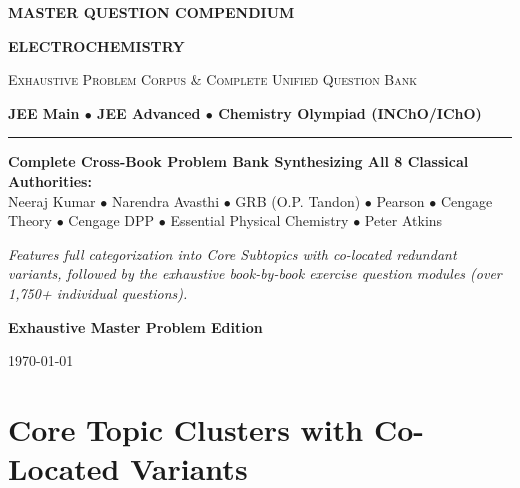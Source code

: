 \documentclass[11pt,a4paper,oneside]{report}
\begin{document}
\begin{titlepage}
    \centering
    \vspace*{1.5cm}
    {\Huge\bfseries\color{primarynavy} MASTER QUESTION COMPENDIUM\par}
    \vspace{0.6cm}
    {\Huge\bfseries\color{cengagegreen} ELECTROCHEMISTRY\par}
    \vspace{0.4cm}
    {\large\scshape Exhaustive Problem Corpus \& Complete Unified Question Bank\par}
    \vspace{0.3cm}
    {\normalsize\color{accentamber}\textbf{JEE Main $\bullet$ JEE Advanced $\bullet$ Chemistry Olympiad (INChO/IChO)}\par}
    
    \vspace{1.5cm}
    \rule{0.85\textwidth}{1.5pt}
    \vspace{1.2cm}
    
    \begin{minipage}{0.85\textwidth}
        \small\centering
        \textbf{Complete Cross-Book Problem Bank Synthesizing All 8 Classical Authorities:}\\
        Neeraj Kumar $\bullet$ Narendra Avasthi $\bullet$ GRB (O.P. Tandon) $\bullet$ Pearson $\bullet$ Cengage Theory $\bullet$ Cengage DPP $\bullet$ Essential Physical Chemistry $\bullet$ Peter Atkins
        \vspace{0.5cm}
        
        \textit{Features full categorization into Core Subtopics with co-located redundant variants, followed by the exhaustive book-by-book exercise question modules (over 1,750+ individual questions).}
    \end{minipage}
    
    \vfill
    {\large\bfseries Exhaustive Master Problem Edition\par}
    \vspace{0.4cm}
    {\small \today\par}
\end{titlepage}

\tableofcontents
\newpage

\part{Core Topic Clusters with Co-Located Variants}







\end{document}
